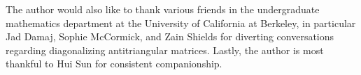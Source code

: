\documentclass{amsart}
\begin{document}
The author would also like to thank various friends in the undergraduate mathematics department at the University of California at Berkeley, in particular Jad Damaj, Sophie McCormick, and Zain Shields for diverting conversations regarding diagonalizing antitriangular matrices. Lastly, the author is most thankful to Hui Sun for consistent companionship.







\printbibliography
\end{document}
